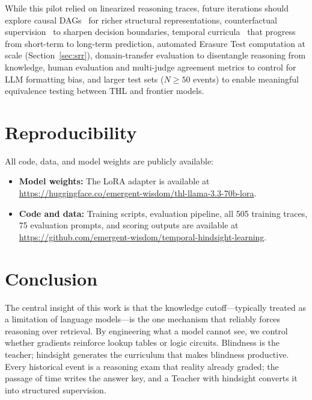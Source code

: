 \documentclass[11pt,a4paper]{article}
\begin{document}
\label{sec:future}
While this pilot relied on linearized reasoning traces, future iterations should explore causal DAGs~\cite{pearl2009causality} for richer structural representations, counterfactual supervision~\cite{kaushik2019learning} to sharpen decision boundaries, temporal curricula~\cite{bengio2009curriculum} that progress from short-term to long-term prediction, automated Erasure Test computation at scale (Section~\ref{sec:srr}), domain-transfer evaluation to disentangle reasoning from knowledge, human evaluation and multi-judge agreement metrics to control for LLM formatting bias, and larger test sets ($N \geq 50$ events) to enable meaningful equivalence testing between THL and frontier models.

\section{Reproducibility}

All code, data, and model weights are publicly available:

\begin{itemize}
    \item \textbf{Model weights:} The LoRA adapter is available at \url{https://huggingface.co/emergent-wisdom/thl-llama-3.3-70b-lora}.
    \item \textbf{Code and data:} Training scripts, evaluation pipeline, all 505 training traces, 75 evaluation prompts, and scoring outputs are available at \url{https://github.com/emergent-wisdom/temporal-hindsight-learning}.
\end{itemize}

\section{Conclusion}

The central insight of this work is that the knowledge cutoff---typically treated as a limitation of language models---is the one mechanism that reliably forces reasoning over retrieval. By engineering what a model cannot see, we control whether gradients reinforce lookup tables or logic circuits. Blindness is the teacher; hindsight generates the curriculum that makes blindness productive. Every historical event is a reasoning exam that reality already graded; the passage of time writes the answer key, and a Teacher with hindsight converts it into structured supervision.
\end{document}
